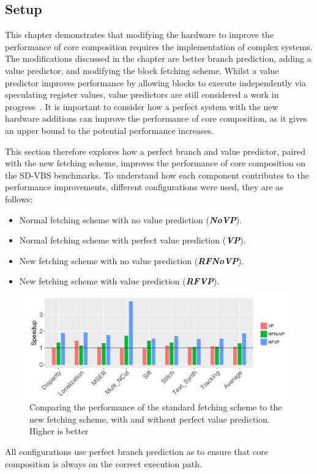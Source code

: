 \newcommand{\novp}{\textit{\textbf{NoVP}}}
\newcommand{\vp}{\textit{\textbf{VP}}}
\newcommand{\nfnovp}{\textit{\textbf{RFNoVP}}}
\newcommand{\nfvp}{\textit{\textbf{RFVP}}}

\newcommand{\optvp}{\textit{\textbf{OptVP}}}
\newcommand{\vt}{\textit{\textbf{VT}}}
\newcommand{\nfvt}{\textit{\textbf{RFVT}}}
\subsection{Setup}
This chapter demonstrates that modifying the hardware to improve the performance of core composition requires the implementation of complex systems.
The modifications discussed in the chapter are better branch prediction, adding a value predictor, and modifying the block fetching scheme.
Whilst a value predictor improves performance by allowing blocks to execute independently via speculating register values, value predictors are still considered a work in progress~\cite{peraisBeBop2015}.
It is important to consider how a perfect system with the new hardware additions can improve the performance of core composition, as it gives an upper bound to the potential performance increases.

This section therefore explores how a perfect branch and value predictor, paired with the new fetching scheme, improves the performance of core composition on the SD-VBS benchmarks.
To understand how each component contributes to the performance improvements, different configurations were used, they are as follows:
\begin{itemize}
\item Normal fetching scheme with no value prediction (\novp).
\vspace{-1em}
\item Normal fetching scheme with perfect value prediction (\vp).
\vspace{-1em}
\item New fetching scheme with no value prediction (\nfnovp).
\vspace{-1em}
\item New fetching scheme with value prediction (\nfvp).
\end{itemize}

\begin{figure}[t]
    \centering
    \includegraphics[width=1\textwidth]{chapter3/graphics/tempres2.pdf}
    \caption{Comparing the performance of the standard fetching scheme to the new fetching scheme, with and without perfect value prediction. Higher is better}
    \label{fig:perf_pred}
\end{figure}
All configurations use perfect branch prediction as to ensure that core composition is always on the correct execution path.

